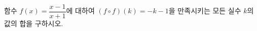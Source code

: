 \hspace*{2mm}\begin{minipage}[t]{\dimexpr\linewidth-2mm\relax}\vspace{0pt}
함수 $f(x)=\dfrac{x-1}{x+1}$에 대하여 $(f\circ f)(k)=-k-1$을 만족시키는 모든 실수 $k$의 값의 합을 구하시오.\end{minipage}
